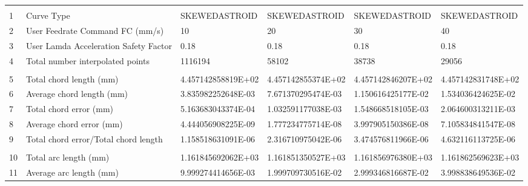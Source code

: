 

\begin{tabular}{ p{0.5cm} p{8.0cm} p{4.00cm} p{4.0cm} p{4.00cm} p{4.0cm}}
\hline
	&                                                      &                    &                      &                    & \\
1	& Curve Type	                                       & SKEWEDASTROID	    & SKEWEDASTROID        & SKEWEDASTROID      &	SKEWEDASTROID \\
2	& User Feedrate Command FC (mm/s)                      &	10	            &    20                &	30	            &    40 \\
3	& User Lamda Acceleration Safety Factor	               &   0.18             &	0.18               &   0.18             &   0.18 \\
4	& Total number interpolated points	                   &   1116194	        &  58102	           & 38738	            & 29056 \\
	&                                                      &                    &                      &                    & \\
5	& Total chord length (mm)	                           & 4.457142858819E+02	& 4.457142855374E+02   & 4.457142846207E+02	& 4.457142831748E+02 \\
6	& Average chord length (mm)	                           & 3.835982252648E-03	& 7.671370295474E-03   & 1.150616425177E-02	& 1.534036424625E-02 \\
7	& Total chord error (mm)	                           & 5.163683043374E-04	& 1.032591177038E-03   & 1.548668518105E-03	& 2.064600313211E-03 \\
8	& Average chord error (mm)	                           & 4.444056908225E-09	& 1.777234775714E-08   & 3.997905150386E-08	& 7.105834841547E-08 \\
9	& Total chord error/Total chord length                 & 1.158518631091E-06	& 2.316710975042E-06   & 3.474576811966E-06	& 4.632116113725E-06 \\
	&                                                      &                    &                      &                    & \\
10	& Total arc length (mm)	                               & 1.161845692062E+03	& 1.161851350527E+03   & 1.161856976380E+03	& 1.161862569623E+03 \\
11	& Average arc length (mm)	                           & 9.999274414656E-03	& 1.999709730516E-02   & 2.999346816687E-02	& 3.998838649536E-02 \\

\end{tabular}
